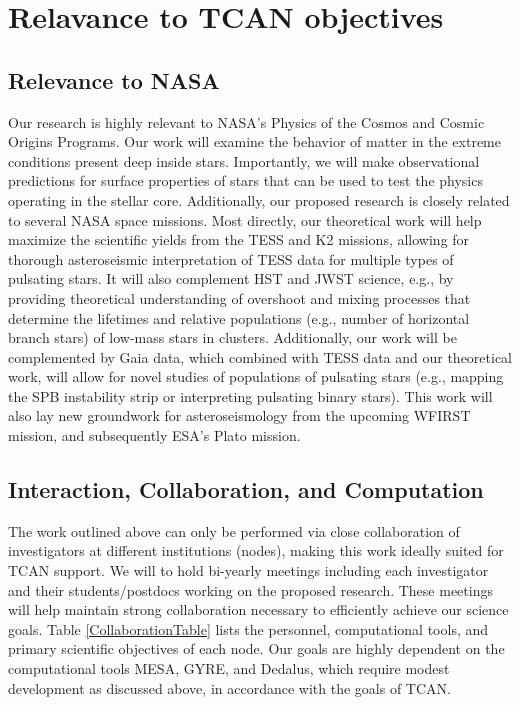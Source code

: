 {\color{orange}
\section{Relavance to TCAN objectives}
}

{\color{orange}
\subsection{Relevance to NASA}
}

Our research is highly relevant to NASA's Physics of the Cosmos and Cosmic Origins Programs. Our work will examine the behavior of matter in the extreme conditions present deep inside stars. Importantly, we will make observational predictions for surface properties of stars that can be used to test the physics operating in the stellar core. Additionally, our proposed research is closely related to several NASA space missions. Most directly, our theoretical work will help maximize the scientific yields from the TESS and K2 missions, allowing for thorough asteroseismic interpretation of TESS data for multiple types of pulsating stars. It will also complement HST and JWST science, e.g., by providing theoretical understanding of overshoot and mixing processes that determine the lifetimes and relative populations (e.g., number of horizontal branch stars) of low-mass stars in clusters. Additionally, our work will be complemented by Gaia data, which combined with TESS data and our theoretical work, will allow for novel studies of populations of pulsating stars (e.g., mapping the SPB instability strip or interpreting pulsating binary stars). This work will also lay new groundwork for asteroseismology from the upcoming WFIRST mission, and subsequently ESA's Plato mission. 


{\color{orange}
\subsection{Interaction, Collaboration, and Computation}
}

The work outlined above can only be performed via close collaboration of investigators at different institutions (nodes), making this work ideally suited for TCAN support. We will to hold bi-yearly meetings including each investigator and their students/postdocs working on the proposed research. These meetings will help maintain strong collaboration necessary to efficiently achieve our science goals. Table \ref{CollaborationTable} lists the personnel, computational tools, and primary scientific objectives of each node. Our goals are highly dependent on the computational tools MESA, GYRE, and Dedalus, which require modest development as discussed above, in accordance with the goals of TCAN.



